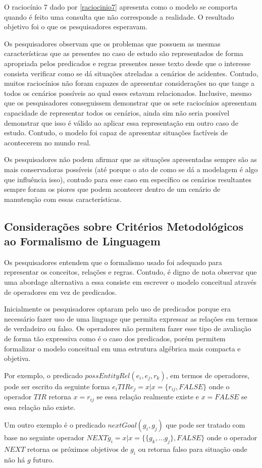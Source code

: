 O raciocínio 7 dado por \ref{raciocinio7} apresenta como o modelo se comporta quando é feito uma consulta que não corresponde a realidade. O resultado objetivo foi o que os pesquisadores esperavam. 

Os pesquisadores observam que os problemas que possuem as mesmas características que as presentes no caso de estudo são representados de forma apropriada pelos predicados e regras presentes nesse texto desde que o interesse consista verificar como se dá situações atreladas a cenários de acidentes. Contudo, muitos raciocínios não foram capazes de apresentar considerações no que tange a todos os cenários possíveis ao qual esses estavam relacionados. Inclusive, mesmo que os pesquisadores conseguissem demonstrar que os sete raciocínios apresentam capacidade de representar todos os cenários, ainda sim não seria 
possível demonstrar que isso é válido ao aplicar essa representação em outro caso de estudo. Contudo, o modelo foi capaz de apresentar situações factíveis 
de acontecerem no mundo real. 

Os pesquisadores não podem afirmar que as situações apresentadas sempre são as mais conservadoras possíveis (até porque o ato de como se dá a modelagem é algo que influência isso), contudo para esse caso em específico os cenários resultantes sempre foram os piores que podem acontecer dentro de um cenário de manutenção com essas características. 

\subsection{Considerações sobre Critérios Metodológicos ao Formalismo de Linguagem}

Os pesquisadores entendem que o formalismo usado foi adequado para representar os conceitos, relações e regras. Contudo, é digno de nota observar que uma abordage alternativa a essa consiste em escrever o modelo conceitual através de operadores em vez de predicados. 

Inicialmente os pesquisadores optaram pelo uso de predicados porque era necessário fazer uso de uma linguage que permita expressar as relações em termos de verdadeiro ou falso. Os operadores não permitem fazer esse tipo de avaliação de forma tão expressiva como é o caso dos predicados, porém permitem formalizar o modelo conceitual em uma estrutura algébrica mais compacta e objetiva. 

Por exemplo, o predicado $possEntityRel(e_i,e_j,r_k)$, em termos de operadores, pode ser escrito da seguinte forma $e_i TIR e_j  = x | x =\{r_{ij},  FALSE \} $ onde o operador $TIR$ retorna $ x = r_{ij} $ se essa relação realmente existe e $ x = FALSE $ se essa relação não existe.  

Um outro exemplo é o predicado $nextGoal(g_i,g_j)$ que pode ser tratado com base no seguinte operador $ NEXT g_i = x | x = \{ \{ g_k, ... g_j \}, FALSE \}$ onde o operador $NEXT$ retorna os próximos objetivos de $g_i$ ou retorna falso para situação onde não há $g$ futuro.    
